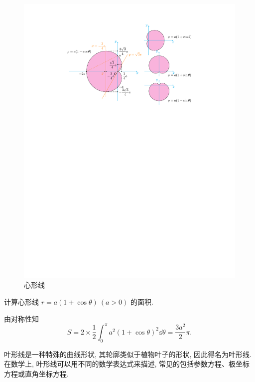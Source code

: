 \begin{figure}[H]
    \centering
    \includegraphics{figures/CardioidLine.pdf}
    \caption{心形线}
    \label{cardioidLine}
\end{figure}

\begin{example}
    计算心形线 $r=a(1+\cos\theta) ~(a>0)$ 的面积.
\end{example}
\begin{solution}
    由对称性知
    $$
        S=2\times\dfrac{1}{2}\int_{0}^{\pi} a^2(1+\cos\theta)^2 \dd \theta=\dfrac{3a^2}{2}\pi.
    $$
\end{solution}


叶形线是一种特殊的曲线形状, 其轮廓类似于植物叶子的形状, 因此得名为叶形线. 在数学上, 叶形线可以用不同的数学表达式来描述, 常见的包括参数方程、极坐标方程或直角坐标方程.

